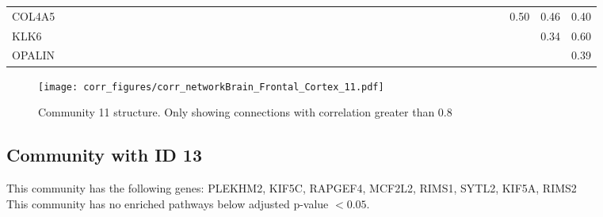 \begin{longtable}{lrrrrrrrrrrrrrrrrrrrrrrrrrrrrrrrrrrrrrrrrrrr}
COL4A5   &               &            &            &              &              &          &              &              &            &            &               &              &           &             &            &             &               &              &               &             &               &              &             &              &               &              &             &            &            &             &           &             &              &           &            &                &                &            &            &              &       0.50 &         0.46 &          0.40 \\
KLK6     &               &            &            &              &              &          &              &              &            &            &               &              &           &             &            &             &               &              &               &             &               &              &             &              &               &              &             &            &            &             &           &             &              &           &            &                &                &            &            &              &            &         0.34 &          0.60 \\
OPALIN   &               &            &            &              &              &          &              &              &            &            &               &              &           &             &            &             &               &              &               &             &               &              &             &              &               &              &             &            &            &             &           &             &              &           &            &                &                &            &            &              &            &              &          0.39 \\
\end{longtable}


\begin{figure}[h!]
\centering
\texttt{[image: corr\_figures/corr\_networkBrain\_Frontal\_Cortex\_11.pdf]}
\caption{Community 11 structure. Only showing connections with correlation greater than 0.8}
\end{figure}




\subsection*{Community with ID 13}
This community has the following genes: PLEKHM2, KIF5C, RAPGEF4, MCF2L2, RIMS1, SYTL2, KIF5A, RIMS2
\\
This community has no enriched pathways below adjusted p-value $< 0.05$.

